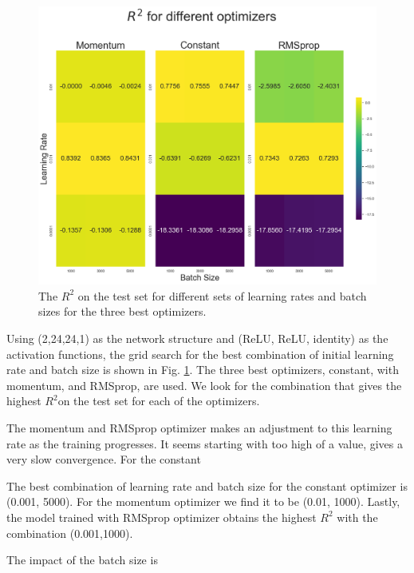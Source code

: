 \begin{figure}[h!]
    \centering
    \includegraphics[width=1.0\linewidth]{project_2/figures/r2_grid_cont.png}
    \caption{The $R^2$ on the test set for different sets of learning rates and batch sizes for the three best optimizers.}
    \label{fig:grid_franke}
\end{figure}

Using (2,24,24,1) as the network structure and (ReLU, ReLU, identity) as the activation functions, the grid search for the best combination of initial learning rate and batch size is shown in Fig. \ref{fig:grid_franke}. The three best optimizers, constant, with momentum, and RMSprop, are used. 
We look for the combination that gives the highest $R^2$on the test set for each of the optimizers. 

The momentum and RMSprop optimizer makes an adjustment to this learning rate as the training progresses. It seems starting with too high of a value, gives a very slow convergence. For the constant 

The best combination of learning rate and batch size for the constant optimizer is (0.001, 5000). For the momentum optimizer we find it to be (0.01, 1000). Lastly, the model trained with RMSprop optimizer obtains the highest $R^2$ with the combination (0.001,1000). 

The impact of the batch size is 


